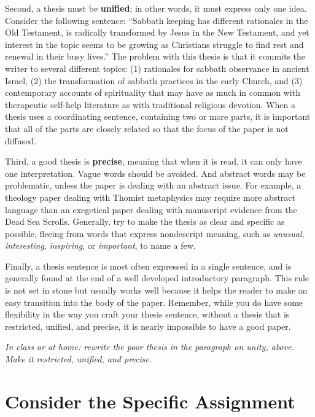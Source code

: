 \documentclass[11pt,twocolumn]{article}
\begin{document}
Second, a thesis must be \textbf{unified}; in other words, it must
express only one idea. Consider the following sentence: “Sabbath keeping
has different rationales in the Old Testament, is radically transformed
by Jesus in the New Testament, and yet interest in the topic seems to be
growing as Christians struggle to find rest and renewal in their busy
lives.” The problem with this thesis is that it commits the writer to
several different topics: (1) rationales for sabbath observance in
ancient Israel, (2) the transformation of sabbath practices in the early
Church, and (3) contemporary accounts of spirituality that may have as
much in common with therapeutic self-help literature as with traditional
religious devotion. When a thesis uses a coordinating sentence,
containing two or more parts, it is important that all of the parts are
closely related so that the focus of the paper is not diffused.

Third, a good thesis is \textbf{precise}, meaning that when it is read,
it can only have one interpretation. Vague words should be avoided. And
abstract words may be problematic, unless the paper is dealing with an
abstract issue. For example, a theology paper dealing with Thomist
metaphysics may require more abstract language than an exegetical paper
dealing with manuscript evidence from the Dead Sea Scrolls. Generally,
try to make the thesis as clear and specific as possible, fleeing from
words that express nondescript meaning, such as \emph{unusual},
\emph{interesting}, \emph{inspiring}, or \emph{important}, to name a
few.

Finally, a thesis sentence is most often expressed in a single sentence,
and is generally found at the end of a well developed introductory
paragraph. This rule is not set in stone but usually works well because
it helps the reader to make an easy transition into the body of the
paper. Remember, while you do have some flexibility in the way you craft
your thesis sentence, without a thesis that is restricted, unified, and
precise, it is nearly impossible to have a good paper.

\vfill

{\noindent\itshape In class or at home: rewrite the poor thesis in the
paragraph on unity, above. Make it restricted, unified, and precise.}

\section{Consider the Specific Assignment}
\end{document}
